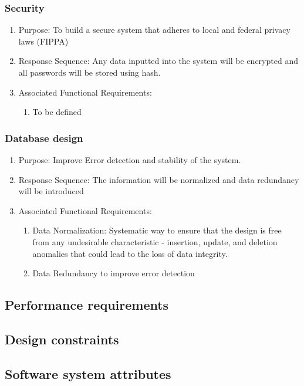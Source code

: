 \documentclass{journal}
\begin{document}
\subsubsection{Security}
\begin{enumerate}
\item Purpose: To build a secure system that adheres to local and federal privacy laws (FIPPA)
\item Response Sequence: Any data inputted into the system will be encrypted and all passwords will be stored using hash.
\item Associated Functional Requirements:
\begin{enumerate}
\item To be defined
\end{enumerate}
\end{enumerate}


\subsubsection{Database design}
\begin{enumerate}
\item Purpose: Improve Error detection and stability of the system.
\item Response Sequence: The information will be normalized and data redundancy will be introduced
\item Associated Functional Requirements:
\begin{enumerate}
\item Data Normalization: Systematic way to ensure that the design is free from any undesirable characteristic - insertion, update, and deletion anomalies that could lead to the loss of data integrity.
\item Data Redundancy to improve error detection
\end{enumerate}
\end{enumerate}
\subsection{Performance requirements}

\subsection{Design constraints}
\subsection{Software system attributes}
\end{document}
